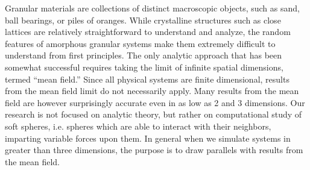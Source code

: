 Granular materials are collections of distinct macroscopic objects, such as sand, ball bearings, or piles of oranges. While crystalline structures such as close lattices are relatively straightforward to understand and analyze, the random features of amorphous granular systems make them extremely difficult to understand from first principles. The only analytic approach that has been somewhat successful requires taking the limit of infinite spatial dimensions, termed ``mean field.'' Since all physical systems are finite dimensional, results from the mean field limit do not necessarily apply. Many results from the mean field are however surprisingly accurate even in as low as 2 and 3 dimensions. Our research is not focused on analytic theory, but rather on computational study of soft spheres, i.e. spheres which are able to interact with their neighbors, imparting variable forces upon them. %
In general when we simulate systems in greater than three dimensions, the purpose is to draw parallels with results from the mean field.


